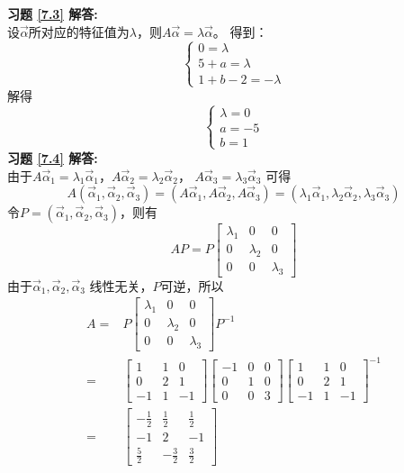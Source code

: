 \documentclass[a4paper]{book}
\begin{document}
\textbf{习题 \ref{7.3} 解答:}\\
设$\vec{\alpha}$所对应的特征值为$\lambda$，则$A\vec{\alpha}=\lambda\vec{\alpha}$。
得到：
\begin{equation*}
  \begin{cases}
  0 = \lambda\\
  5+a = \lambda\\
  1+b-2= -\lambda
  \end{cases}
\end{equation*}
解得
\begin{equation*}
  \begin{cases}
  \lambda=0\\
  a = -5\\
  b = 1
  \end{cases}
\end{equation*}
\textbf{习题 \ref{7.4} 解答:}\\
由于$A\vec{\alpha}_1=\lambda_1\vec{\alpha}_1$，$A\vec{\alpha}_2=\lambda_2\vec{\alpha}_2$，
$A\vec{\alpha}_3=\lambda_3\vec{\alpha}_3$ 可得
\begin{equation*}
A(\vec{\alpha}_1,\vec{\alpha}_2,\vec{\alpha}_3)
=(A\vec{\alpha}_1,A\vec{\alpha}_2,A\vec{\alpha}_3)
=(\lambda_1\vec{\alpha}_1,\lambda_2\vec{\alpha}_2,\lambda_3\vec{\alpha}_3)
\end{equation*}
令$P=(\vec{\alpha}_1,\vec{\alpha}_2,\vec{\alpha}_3)$，则有
\begin{equation*}
AP=P\begin{bmatrix}\lambda_1&0&0\\0&\lambda_2&0\\0&0&\lambda_3\end{bmatrix}
\end{equation*}
由于$\vec{\alpha}_1,\vec{\alpha}_2,\vec{\alpha}_3$ 线性无关，$P$可逆，所以
\begin{align*}
A=&P\begin{bmatrix}\lambda_1&0&0\\0&\lambda_2&0\\0&0&\lambda_3\end{bmatrix}P^{-1}\\
 =&\begin{bmatrix}1&1&0\\0&2&1\\-1&1&-1\end{bmatrix}
   \begin{bmatrix}-1&0&0\\0&1&0\\0&0&3\end{bmatrix}
   \begin{bmatrix}1&1&0\\0&2&1\\-1&1&-1\end{bmatrix}^{-1}\\
  =&\begin{bmatrix}-\frac{1}{2}&\frac{1}{2}&\frac{1}{2}\\
     -1&2&-1\\ \frac{5}{2}&-\frac{3}{2}&\frac{3}{2}\end{bmatrix}
\end{align*}
\end{document}
